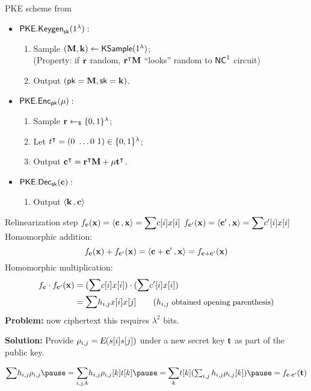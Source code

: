 
\begin{frame}{PKE scheme from \cite{fgcrypto}}
	\begin{itemize}
		\item $\mathsf{PKE.Keygen}_{\mathsf{sk}}(1^{\lambda}):$
		\begin{enumerate}
			\item Sample $(\mathbf{M}, \mathbf{k}) \gets \mathsf{KSample}(1^{\lambda})$;\\
			 {\color{red}(Property: if $\mathbf{r}$ random, ${\mathbf{r}}^{\intercal}  \mathbf{M}$ ``looks'' random to ${\mathsf{NC}}^1$ circuit)}
			\item Output $(\mathsf{pk} = \mathbf{M}, \mathsf{sk} = \mathbf{k})$.
		\end{enumerate}
		\pause
		\item $\mathsf{PKE.Enc}_{\mathsf{pk}}(\mu):$
		\begin{enumerate}
			\item Sample $\mathbf{r} \leftarrow_{\$} \{0, 1\}^{\lambda}$;
			\item Let ${t}^{\intercal} = (0 \ \dots 0 \ 1) \in \{0, 1\}^{\lambda}$;
			\item Output $\transp{\c} = \transp{\r}  \M + \mu\transp{\t}$.
		\end{enumerate}
		\pause
		\item $\PKEDec_{\sk}(\c):$
		\begin{enumerate}
			\item Output $\inprod{\k}{\c}$
		\end{enumerate}
		
	\end{itemize}
\end{frame}

\def\c{\vect{c}}
\def\cp{\vect{c'}}
\def\fc{f_{\c}}
\def\fcp{f_{\cp}}
\def\x{\vect{x}}

\begin{frame}{Relinearization step}
 $  \fc(\x) = \inprod{\c}{\vect{x}} = \Sum c[i] x[i]$ \quad\quad\quad
 $  \fcp(\x) = \inprod{\cp}{\vect{x}} = \Sum c'[i] x[i]$
  \pause\\
 \medskip
 Homomorphic addition:
$$ \fc(\x)+\fcp(\x) = \inprod{\c+\cp}{\vect{x}}  = f_{\c+\cp}(\x) $$ 
\medskip 
\pause
Homomorphic multiplication:
 \begin{align*}
 \fc\cdot\fcp(\x)  & =   (\Sum c[i] x[i]) \cdot (\Sum c'[i]x[i]) \\
        				 & =  \Sum h_{i,j} x[i]x[j]   \quad\quad \small{( h_{i,j} \text{ obtained opening parenthesis})}
\end{align*}
\pause
\textbf{Problem:} now ciphertext this requires $\lambda^2$ bits.\pause

\textbf{Solution:} Provide $\mathbf{\rho}_{i,j} = {\textsl{E}}(s[i]s[j])$ under a new secret key $\mathbf{t}$ as part of the public key.\pause
 
$
  \Sum h_{i,j} \vect{\rho}_{i,j}\pause  %
=  \Sum_{i,j,k} h_{i,j} \rho_{i,j}[k] t[k] \pause = \Sum_k t[k](\sum_{i,j} h_{i,j} \rho_{i,j}[k])\pause = f_{\c\cdot\cp}(\vect{t})
$
 
\end{frame}
%
